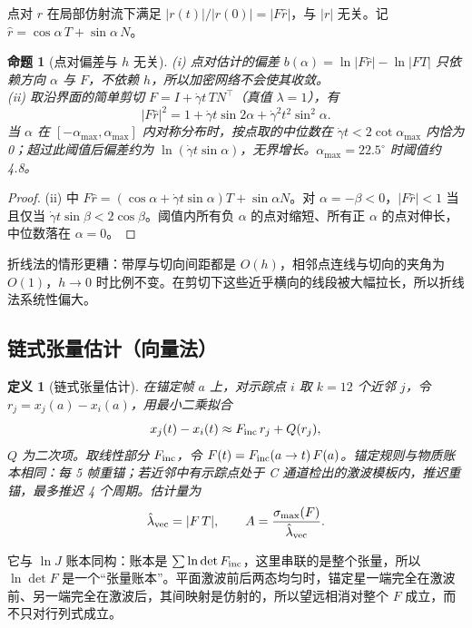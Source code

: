 \documentclass[10.5pt,a4paper]{article}
\theoremstyle{plain}
\newtheorem{prop}{命题}\newtheorem{coro}{推论}\newtheorem{defi}{定义}
\begin{document}
点对 $r$ 在局部仿射流下满足 $|r(t)|/|r(0)|=|F\hat r|$，与 $|r|$ 无关。记 $\hat r=\cos\alpha\,T+\sin\alpha\,N$。

\begin{prop}[点对偏差与 $h$ 无关]\label{prop:pair}
(i) 点对估计的偏差 $b(\alpha)=\ln|F\hat r|-\ln|FT|$ 只依赖方向 $\alpha$ 与 $F$，不依赖 $h$，所以加密网络不会使其收敛。\\
(ii) 取沿界面的简单剪切 $F=I+\dot\gamma t\,TN^\top$（真值 $\lambda=1$），有
\begin{equation}
|F\hat r|^2=1+\dot\gamma t\sin2\alpha+\dot\gamma^2t^2\sin^2\alpha .
\end{equation}
当 $\alpha$ 在 $[-\alpha_{\max},\alpha_{\max}]$ 内对称分布时，按点取的中位数在 $\dot\gamma t<2\cot\alpha_{\max}$ 内恰为 0；超过此阈值后偏差约为 $\ln(\dot\gamma t\sin\alpha)$，无界增长。$\alpha_{\max}=22.5^\circ$ 时阈值约 4.8。
\end{prop}
\begin{proof}
(ii) 中 $F\hat r=(\cos\alpha+\dot\gamma t\sin\alpha)T+\sin\alpha N$。对 $\alpha=-\beta<0$，$|F\hat r|<1$ 当且仅当 $\dot\gamma t\sin\beta<2\cos\beta$。阈值内所有负 $\alpha$ 的点对缩短、所有正 $\alpha$ 的点对伸长，中位数落在 $\alpha=0$。
\end{proof}
折线法的情形更糟：带厚与切向间距都是 $O(h)$，相邻点连线与切向的夹角为 $O(1)$，$h\to0$ 时比例不变。在剪切下这些近乎横向的线段被大幅拉长，所以折线法系统性偏大。

\subsection{链式张量估计（向量法）}

\begin{defi}[链式张量估计]
在锚定帧 $a$ 上，对示踪点 $i$ 取 $k=12$ 个近邻 $j$，令 $r_j=x_j(a)-x_i(a)$，用最小二乘拟合
\begin{equation}
x_j(t)-x_i(t)\approx F_{\rm inc}\,r_j+Q(r_j),
\end{equation}
$Q$ 为二次项。取线性部分 $F_{\rm inc}$，令 $F(t)=F_{\rm inc}(a\to t)\,F(a)$。锚定规则与物质账本相同：每 5 帧重锚；若近邻中有示踪点处于 C 通道检出的激波模板内，推迟重锚，最多推迟 4 个周期。估计量为
\begin{equation}
\hat\lambda_{\rm vec}=|F\,T|,\qquad A=\frac{\sigma_{\max}(F)}{\hat\lambda_{\rm vec}} .
\end{equation}
\end{defi}

它与 $\ln J$ 账本同构：账本是 $\sum\ln\det F_{\rm inc}$，这里串联的是整个张量，所以 $\ln\det F$ 是一个“张量账本”。平面激波前后两态均匀时，锚定星一端完全在激波前、另一端完全在激波后，其间映射是仿射的，所以望远相消对整个 $F$ 成立，而不只对行列式成立。
\end{document}
